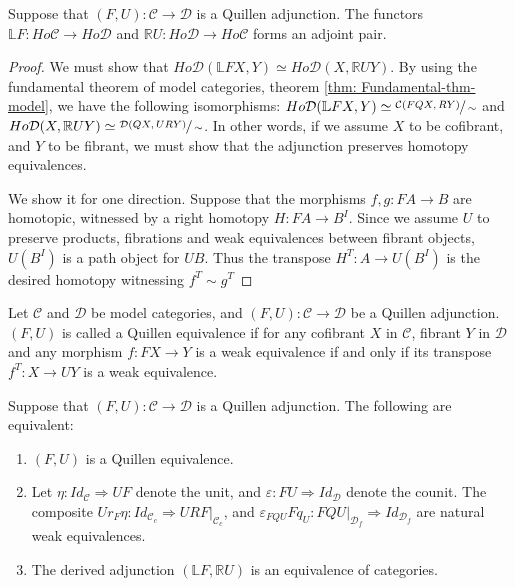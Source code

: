 \documentclass[../thesis.tex]{subfiles}
\begin{document}
            \begin{proposition}
                Suppose that $(F,U):\mathcal{C}\rightarrow\mathcal{D}$ is a Quillen adjunction. The functors $\mathbb{L}F:Ho\mathcal{C}\rightarrow Ho\mathcal{D}$ and $\mathbb{R}U: Ho\mathcal{D}\rightarrow Ho\mathcal{C}$ forms an adjoint pair.
            \end{proposition}

            \begin{proof}
                We must show that $Ho\mathcal{D}(\mathbb{L}FX, Y) \simeq Ho\mathcal{D}(X, \mathbb{R}UY)$. By using the fundamental theorem of model categories, theorem \ref{thm: Fundamental-thm-model}, we have the following isomorphisms: $Ho\mathcal{D}(\mathbb{L}FX,Y)\simeq \sfrac{\mathcal{C}(FQX,RY)}{\sim}$ and $Ho\mathcal{D}(X,\mathbb{R}UY)\simeq\sfrac{\mathcal{D}(QX,URY)}{\sim}$. In other words, if we assume $X$ to be cofibrant, and $Y$ to be fibrant, we must show that the adjunction preserves homotopy equivalences.

                We show it for one direction. Suppose that the morphisms $f,g:FA\rightarrow B$ are homotopic, witnessed by a right homotopy $H:FA\rightarrow B^I$. Since we assume $U$ to preserve products, fibrations and weak equivalences between fibrant objects, $U(B^I)$ is a path object for $UB$. Thus the transpose $H^T:A\rightarrow U(B^I)$ is the desired homotopy witnessing $f^T \sim g^T$
            \end{proof}

            \begin{definition}
                Let $\mathcal{C}$ and $\mathcal{D}$ be model categories, and $(F,U):\mathcal{C}\rightarrow\mathcal{D}$ be a Quillen adjunction. $(F,U)$ is called a Quillen equivalence if for any cofibrant $X$ in $\mathcal{C}$, fibrant $Y$ in $\mathcal{D}$ and any morphism $f:FX\rightarrow Y$ is a weak equivalence if and only if its transpose $f^T:X\rightarrow UY$ is a weak equivalence.
            \end{definition}

            \begin{proposition}\label{prop: Quill-Eq}
                Suppose that $(F,U):\mathcal{C}\rightarrow\mathcal{D}$ is a Quillen adjunction. The following are equivalent:
                \begin{enumerate}
                    \item $(F,U)$ is a Quillen equivalence.
                    \item Let $\eta :Id_\mathcal{C}\Rightarrow UF$ denote the unit, and $\varepsilon :FU\Rightarrow Id_\mathcal{D}$ denote the counit. The composite $Ur_{F}\eta : Id_{\mathcal{C}_c} \Rightarrow URF|_{\mathcal{C}_c}$, and $\varepsilon_{FQU}Fq_{U}:FQU|_{\mathcal{D}_f} \Rightarrow Id_{\mathcal{D}_f}$ are natural weak equivalences.
                    \item The derived adjunction $(\mathbb{L}F, \mathbb{R}U)$ is an equivalence of categories.
                \end{enumerate}
            \end{proposition}
\end{document}
